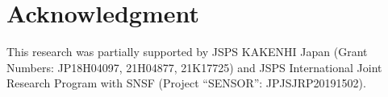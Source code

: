 \documentclass[sigconf]{acmart}
\begin{document}


% 

%

% 

% 



\section*{Acknowledgment}
This research was partially supported by JSPS KAKENHI Japan (Grant Numbers: JP18H04097, 21H04877, 21K17725) and JSPS International Joint Research Program with SNSF (Project ``SENSOR'': JPJSJRP20191502).




\end{document}
